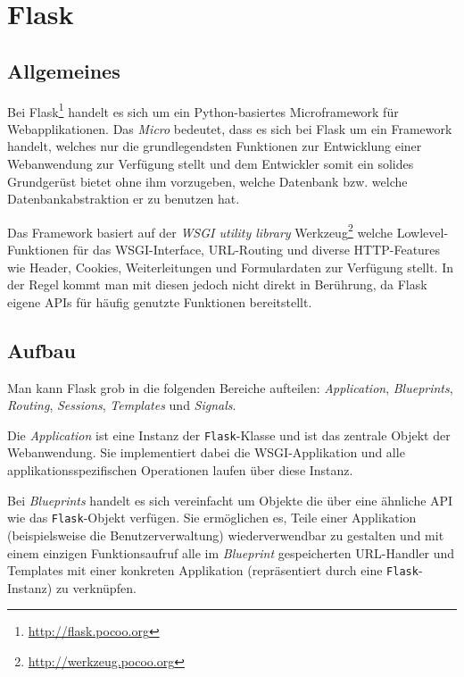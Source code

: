 \chapter{Flask}
\section{Allgemeines}

Bei Flask\footnote{\href{http://flask.pocoo.org}{http://flask.pocoo.org}} handelt es sich um ein
Python-basiertes Microframework für Webapplikationen. Das \emph{Micro} bedeutet, dass es sich bei
Flask um ein Framework handelt, welches nur die grundlegendsten Funktionen zur Entwicklung einer
Webanwendung zur Verfügung stellt und dem Entwickler somit ein solides Grundgerüst bietet ohne ihm
vorzugeben, welche Datenbank bzw. welche Datenbankabstraktion er zu benutzen hat.

Das Framework basiert auf der \emph{WSGI utility library}
Werkzeug\footnote{\href{http://werkzeug.pocoo.org}{http://werkzeug.pocoo.org}} welche
Lowlevel-Funktionen für das WSGI-Interface, URL-Routing und diverse HTTP-Features wie Header,
Cookies, Weiterleitungen und Formulardaten zur Verfügung stellt. In der Regel kommt man mit diesen
jedoch nicht direkt in Berührung, da Flask eigene APIs für häufig genutzte Funktionen bereitstellt.

\section{Aufbau}

Man kann Flask grob in die folgenden Bereiche aufteilen: \emph{Application}, \emph{Blueprints},
\emph{Routing}, \emph{Sessions}, \emph{Templates} und \emph{Signals}.

Die \emph{Application} ist eine Instanz der \lstinline{Flask}-Klasse und ist das zentrale Objekt der
Webanwendung. Sie implementiert dabei die WSGI-Applikation und alle applikationsspezifischen
Operationen laufen über diese Instanz.

Bei \emph{Blueprints} handelt es sich vereinfacht um Objekte die über eine ähnliche API wie das
\lstinline{Flask}-Objekt verfügen. Sie ermöglichen es, Teile einer Applikation (beispielsweise die
Benutzerverwaltung) wiederverwendbar zu gestalten und mit einem einzigen Funktionsaufruf alle im
\emph{Blueprint} gespeicherten URL-Handler und Templates mit einer konkreten Applikation
(repräsentiert durch eine \lstinline{Flask}-Instanz) zu verknüpfen.

